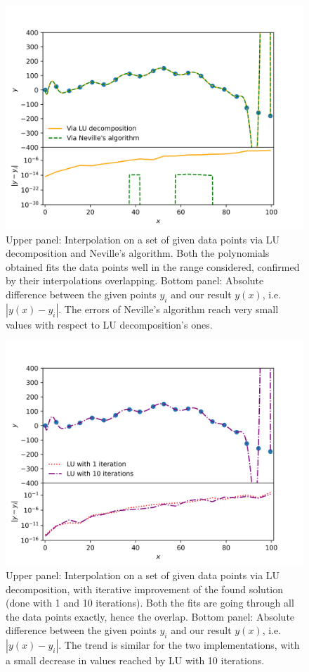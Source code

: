 \begin{figure}[h!]
  \centering
  \includegraphics[width=0.9\linewidth]{./plots/my_vandermonde_sol_2b.png}
  \caption{Upper panel: Interpolation on a set of given data points via LU decomposition and Neville's algorithm. Both the polynomials obtained fits the data points well in the range considered, confirmed by their interpolations overlapping. Bottom panel: Absolute difference between the given points $y_i$ and our result $y(x)$, i.e. $|y(x) - y_{i}|$. The errors of Neville's algorithm reach very small values with respect to LU decomposition's ones. }
  \label{fig:neville}
\end{figure}

\begin{figure}[h!]
  \centering
  \includegraphics[width=0.8\linewidth]{./plots/my_vandermonde_sol_2c.png}
  \caption{Upper panel: Interpolation on a set of given data points via LU decomposition, with iterative improvement of the found solution (done with 1 and 10 iterations). Both the fits are going through all the data points exactly, hence the overlap. Bottom panel: Absolute difference between the given points $y_i$ and our result $y(x)$, i.e. $|y(x) - y_{i}|$. The trend is similar for the two implementations, with a small decrease in values reached by LU with 10 iterations.}
  \label{fig:lu_iter}
\end{figure}
